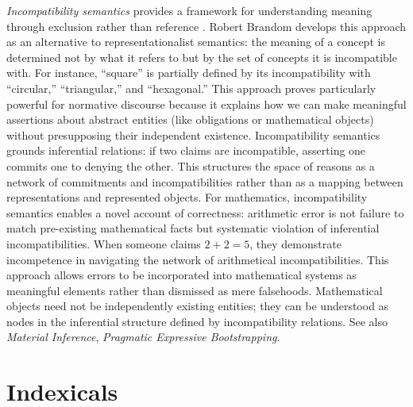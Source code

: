 \documentclass{book}
\begin{document}
\textit{Incompatibility semantics} provides a framework for understanding meaning through exclusion rather than reference \parencite{brandom1994making, Brandom2008}. Robert Brandom develops this approach as an alternative to representationalist semantics: the meaning of a concept is determined not by what it refers to but by the set of concepts it is incompatible with. For instance, ``square'' is partially defined by its incompatibility with ``circular,'' ``triangular,'' and ``hexagonal.'' This approach proves particularly powerful for normative discourse because it explains how we can make meaningful assertions about abstract entities (like obligations or mathematical objects) without presupposing their independent existence. Incompatibility semantics grounds inferential relations: if two claims are incompatible, asserting one commits one to denying the other. This structures the space of reasons as a network of commitments and incompatibilities rather than as a mapping between representations and represented objects. For mathematics, incompatibility semantics enables a novel account of correctness: arithmetic error is not failure to match pre-existing mathematical facts but systematic violation of inferential incompatibilities. When someone claims $2 + 2 = 5$, they demonstrate incompetence in navigating the network of arithmetical incompatibilities. This approach allows errors to be incorporated into mathematical systems as meaningful elements rather than dismissed as mere falsehoods. Mathematical objects need not be independently existing entities; they can be understood as nodes in the inferential structure defined by incompatibility relations. See also \textit{Material Inference}, \textit{Pragmatic Expressive Bootstrapping}.

\section{Indexicals}
\end{document}
